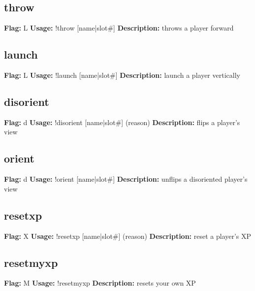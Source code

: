 \subsection{throw}
\textbf{Flag:} \hfill L \linebreak\textbf{Usage:} \hfill !throw [name|slot\#] \linebreak
\textbf{Description:} \hfill throws a player forward

\subsection{launch}
\textbf{Flag:} \hfill L \linebreak\textbf{Usage:} \hfill !launch [name|slot\#] \linebreak
\textbf{Description:} \hfill launch a player vertically

\subsection{disorient}
\textbf{Flag:} \hfill d \linebreak\textbf{Usage:} \hfill !disorient [name|slot\#] (reason) \linebreak
\textbf{Description:} \hfill flips a player's view

\subsection{orient}
\textbf{Flag:} \hfill d \linebreak\textbf{Usage:} \hfill !orient [name|slot\#] \linebreak
\textbf{Description:} \hfill unflips a disoriented player's view

\subsection{resetxp}
\textbf{Flag:} \hfill X \linebreak\textbf{Usage:} \hfill !resetxp [name|slot\#] (reason) \linebreak
\textbf{Description:} \hfill reset a player's XP

\subsection{resetmyxp}
\textbf{Flag:} \hfill M \linebreak\textbf{Usage:} \hfill !resetmyxp  \linebreak
\textbf{Description:} \hfill resets your own XP


